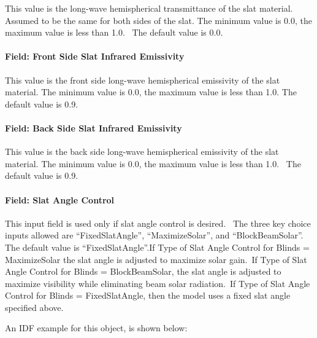 This value is the long-wave hemispherical transmittance of the slat material. Assumed to be the same for both sides of the slat. The minimum value is 0.0, the maximum value is less than 1.0.~ The default value is 0.0.

\paragraph{Field: Front Side Slat Infrared Emissivity}\label{field-front-side-slat-infrared-emissivity}

This value is the front side long-wave hemispherical emissivity of the slat material. The minimum value is 0.0, the maximum value is less than 1.0. The default value is 0.9.

\paragraph{Field: Back Side Slat Infrared Emissivity}\label{field-back-side-slat-infrared-emissivity}

This value is the back side long-wave hemispherical emissivity of the slat material. The minimum value is 0.0, the maximum value is less than 1.0.~ The default value is 0.9.

\paragraph{Field: Slat Angle Control}\label{field-slat-angle-control}

This input field is used only if slat angle control is desired.~ The three key choice inputs allowed are ``FixedSlatAngle'', ``MaximizeSolar'', and ``BlockBeamSolar''.~ The default value is ``FixedSlatAngle''.If Type of Slat Angle Control for Blinds = MaximizeSolar the slat angle is adjusted to maximize solar gain.~If Type of Slat Angle Control for Blinds = BlockBeamSolar, the slat angle is adjusted to maximize visibility while eliminating beam solar radiation.~If Type of Slat Angle Control for Blinds = FixedSlatAngle, then the model uses a fixed slat angle specified above.

An IDF example for this object, is shown below:

